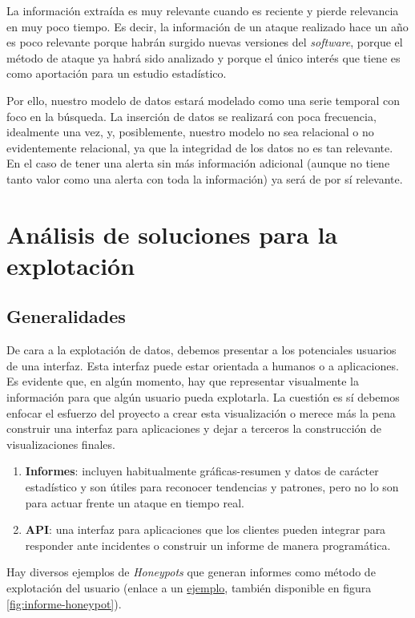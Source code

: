 La información extraída es muy relevante cuando es reciente y pierde relevancia en muy poco tiempo. Es decir, la información de un ataque realizado
hace un año es poco relevante porque habrán surgido nuevas versiones del \emph{software}, porque el método de ataque ya habrá sido analizado y porque el único interés
que tiene es como aportación para un estudio estadístico.

Por ello, nuestro modelo de datos estará modelado como una serie temporal con foco en la búsqueda. La inserción de datos se realizará con poca frecuencia, idealmente una vez,
y, posiblemente, nuestro modelo no sea relacional o no evidentemente relacional, ya que la integridad de los datos no es tan relevante.
En el caso de tener una alerta sin más información adicional (aunque no tiene tanto valor como una alerta con toda la información) ya será de por sí relevante.

\section{Análisis de soluciones para la explotación}

\subsection{Generalidades}

De cara a la explotación de datos, debemos presentar a los potenciales usuarios de una interfaz. Esta interfaz puede estar
orientada a humanos o a aplicaciones. Es evidente que, en algún momento, hay que representar visualmente la información para que algún usuario pueda explotarla.
La cuestión es sí debemos enfocar el esfuerzo del proyecto a crear esta visualización o merece más la pena construir
una interfaz para aplicaciones y dejar a terceros la construcción de visualizaciones finales.

\begin{enumerate}
    \item \textbf{Informes}: incluyen habitualmente gráficas-resumen y datos de carácter estadístico y son útiles para reconocer tendencias y patrones, pero no lo son para actuar frente un ataque en tiempo real.
    \item \textbf{API}: una interfaz para aplicaciones que los clientes pueden integrar para responder ante incidentes o construir un informe de manera programática.
\end{enumerate}

Hay diversos ejemplos de \emph{Honeypots} que generan informes como método de explotación del usuario (enlace a un \href{http://www.nothink.org/honeypot_ssh.php}{ejemplo}, también disponible en figura \ref{fig:informe-honeypot}).

